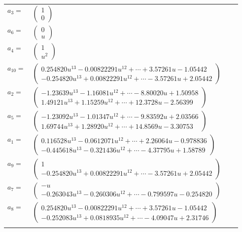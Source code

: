 \documentclass[1p]{elsarticle_modified}
\theoremstyle{definition}
\begin{document}
\begin{tabular}{m{7pt} m{180pt} m{7pt} m{180pt} }
\flushright $a_{3}=$&$\begin{pmatrix}1\\0\end{pmatrix}$ \\
\flushright $a_{6}=$&$\begin{pmatrix}0\\u\end{pmatrix}$ \\
\flushright $a_{4}=$&$\begin{pmatrix}1\\u^2\end{pmatrix}$ \\
\flushright $a_{10}=$&$\begin{pmatrix}0.254820 u^{13}-0.00822291 u^{12}+\cdots+3.57261 u-1.05442\\-0.254820 u^{13}+0.00822291 u^{12}+\cdots-3.57261 u+2.05442\end{pmatrix}$ \\
\flushright $a_{2}=$&$\begin{pmatrix}-1.23639 u^{13}-1.16081 u^{12}+\cdots-8.80020 u+1.50958\\1.49121 u^{13}+1.15259 u^{12}+\cdots+12.3728 u-2.56399\end{pmatrix}$ \\
\flushright $a_{5}=$&$\begin{pmatrix}-1.23092 u^{13}-1.01347 u^{12}+\cdots-9.83592 u+2.03566\\1.69744 u^{13}+1.28920 u^{12}+\cdots+14.8569 u-3.30753\end{pmatrix}$ \\
\flushright $a_{1}=$&$\begin{pmatrix}0.116528 u^{13}-0.0612071 u^{12}+\cdots+2.26064 u-0.978836\\-0.445618 u^{13}-0.321436 u^{12}+\cdots-4.37795 u+1.58789\end{pmatrix}$ \\
\flushright $a_{9}=$&$\begin{pmatrix}1\\-0.254820 u^{13}+0.00822291 u^{12}+\cdots-3.57261 u+2.05442\end{pmatrix}$ \\
\flushright $a_{7}=$&$\begin{pmatrix}- u\\-0.263043 u^{13}-0.260306 u^{12}+\cdots-0.799597 u-0.254820\end{pmatrix}$ \\
\flushright $a_{8}=$&$\begin{pmatrix}0.254820 u^{13}-0.00822291 u^{12}+\cdots+3.57261 u-1.05442\\-0.252083 u^{13}+0.0818935 u^{12}+\cdots-4.09047 u+2.31746\end{pmatrix}$\\&\end{tabular}
\end{document}

